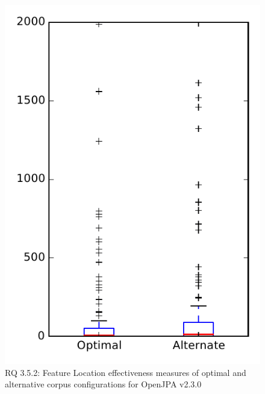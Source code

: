 
\begin{figure}
\centering
\includegraphics[height=0.4\textheight]{figures/combo/flt_rq2_openjpa}
\caption{RQ 3.5.2: Feature Location effectiveness measures of optimal and alternative corpus configurations for OpenJPA v2.3.0}
\label{fig:combo:flt:rq2:openjpa}
\end{figure}
